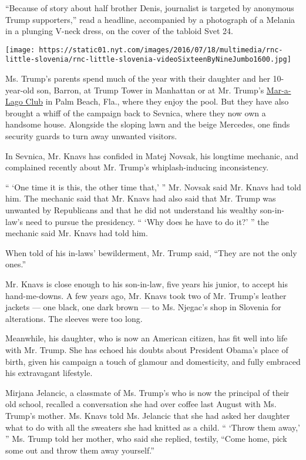 ``Because of story about half brother Denis, journalist is targeted by
anonymous Trump supporters,'' read a headline, accompanied by a
photograph of a Melania in a plunging V-neck dress, on the cover of the
tabloid Svet 24.

\texttt{[image: https://static01.nyt.com/images/2016/07/18/multimedia/rnc-little-slovenia/rnc-little-slovenia-videoSixteenByNineJumbo1600.jpg]}

Ms. Trump's parents spend much of the year with their daughter and her
10-year-old son, Barron, at Trump Tower in Manhattan or at Mr. Trump's
\href{http://www.nytimes.com/2016/02/26/us/politics/donald-trump-taps-foreign-work-force-for-his-florida-club.html}{Mar-a-Lago
Club} in Palm Beach, Fla., where they enjoy the pool. But they have also
brought a whiff of the campaign back to Sevnica, where they now own a
handsome house. Alongside the sloping lawn and the beige Mercedes, one
finds security guards to turn away unwanted visitors.

In Sevnica, Mr. Knavs has confided in Matej Novsak, his longtime
mechanic, and complained recently about Mr. Trump's whiplash-inducing
inconsistency.

`` `One time it is this, the other time that,' '' Mr. Novsak said Mr.
Knavs had told him. The mechanic said that Mr. Knavs had also said that
Mr. Trump was unwanted by Republicans and that he did not understand his
wealthy son-in-law's need to pursue the presidency. `` `Why does he have
to do it?' '' the mechanic said Mr. Knavs had told him.

When told of his in-laws' bewilderment, Mr. Trump said, ``They are not
the only ones.''

Mr. Knavs is close enough to his son-in-law, five years his junior, to
accept his hand-me-downs. A few years ago, Mr. Knavs took two of Mr.
Trump's leather jackets --- one black, one dark brown --- to Ms.
Njegac's shop in Slovenia for alterations. The sleeves were too long.

Meanwhile, his daughter, who is now an American citizen, has fit well
into life with Mr. Trump. She has echoed his doubts about President
Obama's place of birth, given his campaign a touch of glamour and
domesticity, and fully embraced his extravagant lifestyle.

Mirjana Jelancic, a classmate of Ms. Trump's who is now the principal of
their old school, recalled a conversation she had over coffee last
August with Ms. Trump's mother. Ms. Knavs told Ms. Jelancic that she had
asked her daughter what to do with all the sweaters she had knitted as a
child. `` `Throw them away,' '' Ms. Trump told her mother, who said she
replied, testily, ``Come home, pick some out and throw them away
yourself.''

